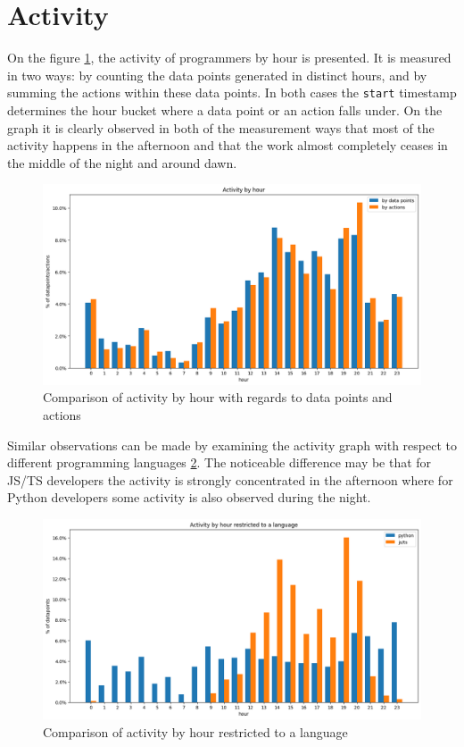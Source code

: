 \section{Activity}

On the figure \ref{fig:activity_by_hour}, the activity of programmers by hour is presented. It is measured in two ways: by counting the data points generated in distinct hours, and by summing the actions within these data points. In both cases the \texttt{start} timestamp determines the hour bucket where a data point or an action falls under. On the graph it is clearly observed in both of the measurement ways that most of the activity happens in the afternoon and that the work almost completely ceases in the middle of the night and around dawn.

\begin{figure}[htbp]
  \centering
  \includegraphics[scale=0.5]{chapters/results/graphics/activity-by-hour.png}
  \caption{Comparison of activity by hour with regards to data points and actions}
  \label{fig:activity_by_hour}
\end{figure}

Similar observations can be made by examining the activity graph with respect to different programming languages \ref{fig:activity_by_hour_langs}. The noticeable difference may be that for JS/TS developers the activity is strongly concentrated in the afternoon where for Python developers some activity is also observed during the night.

\begin{figure}[htbp]
  \centering
  \includegraphics[scale=0.5]{chapters/results/graphics/activity-by-hour-langs.png}
  \caption{Comparison of activity by hour restricted to a language}
  \label{fig:activity_by_hour_langs}
\end{figure}


